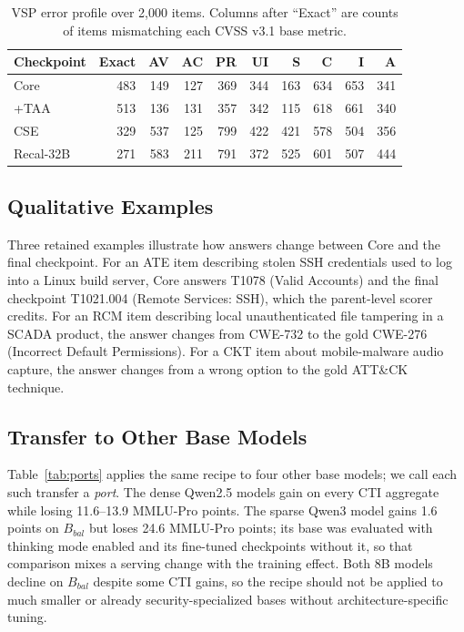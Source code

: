 \documentclass[conference]{IEEEtran}
\begin{document}
\begin{table}[t]
\caption{VSP error profile over 2,000 items. Columns after ``Exact'' are counts of items mismatching each CVSS v3.1 base metric.}
\label{tab:vsp}
\centering
\scriptsize
\setlength{\tabcolsep}{2.2pt}
\begin{tabular}{@{}lrrrrrrrrr@{}}
\toprule
Checkpoint & Exact & AV & AC & PR & UI & S & C & I & A \\
\midrule
Core & 483 & 149 & 127 & 369 & 344 & 163 & 634 & 653 & 341 \\
+TAA & 513 & 136 & 131 & 357 & 342 & 115 & 618 & 661 & 340 \\
CSE & 329 & 537 & 125 & 799 & 422 & 421 & 578 & 504 & 356 \\
Recal-32B & 271 & 583 & 211 & 791 & 372 & 525 & 601 & 507 & 444 \\
\bottomrule
\end{tabular}
\end{table}

\subsection{Qualitative Examples}
Three retained examples illustrate how answers change between Core and the final checkpoint. For an ATE item describing stolen SSH credentials used to log into a Linux build server, Core answers T1078 (Valid Accounts) and the final checkpoint T1021.004 (Remote Services: SSH), which the parent-level scorer credits. For an RCM item describing local unauthenticated file tampering in a SCADA product, the answer changes from CWE-732 to the gold CWE-276 (Incorrect Default Permissions). For a CKT item about mobile-malware audio capture, the answer changes from a wrong option to the gold ATT\&CK technique.

\subsection{Transfer to Other Base Models}\label{sec:ports}
Table~\ref{tab:ports} applies the same recipe to four other base models; we call each such transfer a \emph{port}. The dense Qwen2.5 models gain on every CTI aggregate while losing 11.6--13.9 MMLU-Pro points. The sparse Qwen3 model gains 1.6 points on $B_{bal}$ but loses 24.6 MMLU-Pro points; its base was evaluated with thinking mode enabled and its fine-tuned checkpoints without it, so that comparison mixes a serving change with the training effect. Both 8B models decline on $B_{bal}$ despite some CTI gains, so the recipe should not be applied to much smaller or already security-specialized bases without architecture-specific tuning.
\end{document}

